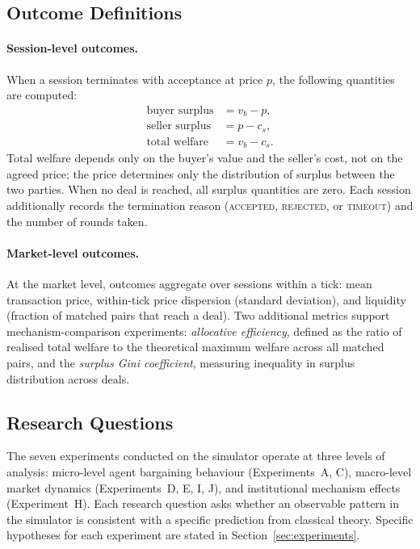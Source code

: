 \subsection{Outcome Definitions}
\label{sec:outcomes}

\paragraph{Session-level outcomes.}
When a session terminates with acceptance at price $p$, the following quantities are computed:
\begin{align}
    \text{buyer surplus} &= v_b - p, \\
    \text{seller surplus} &= p - c_s, \\
    \text{total welfare} &= v_b - c_s.
\end{align}
Total welfare depends only on the buyer's value and the seller's cost, not on the agreed price; the price determines only the distribution of surplus between the two parties.  When no deal is reached, all surplus quantities are zero.  Each session additionally records the termination reason (\textsc{accepted}, \textsc{rejected}, or \textsc{timeout}) and the number of rounds taken.

\paragraph{Market-level outcomes.}
At the market level, outcomes aggregate over sessions within a tick: mean transaction price, within-tick price dispersion (standard deviation), and liquidity (fraction of matched pairs that reach a deal).  Two additional metrics support mechanism-comparison experiments: \emph{allocative efficiency}, defined as the ratio of realised total welfare to the theoretical maximum welfare across all matched pairs, and the \emph{surplus Gini coefficient}, measuring inequality in surplus distribution across deals.

\subsection{Research Questions}
\label{sec:rqs}

The seven experiments conducted on the simulator operate at three levels of analysis: micro-level agent bargaining behaviour (Experiments~A, C), macro-level market dynamics (Experiments~D, E, I, J), and institutional mechanism effects (Experiment~H).  Each research question asks whether an observable pattern in the simulator is consistent with a specific prediction from classical theory.  Specific hypotheses for each experiment are stated in Section~\ref{sec:experiments}.

